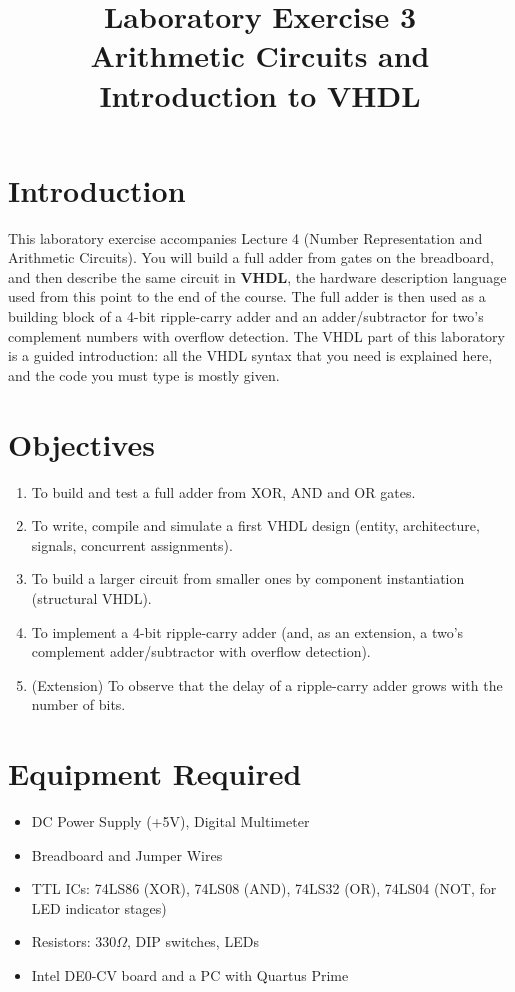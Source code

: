 \documentclass{article}
\title{Laboratory Exercise 3 \\ Arithmetic Circuits and Introduction to VHDL}
\author{}
\date{}
\begin{document}
\maketitle

\section*{Introduction}
This laboratory exercise accompanies Lecture 4 (Number Representation and Arithmetic Circuits). You will build a full adder from gates on the breadboard, and then describe the same circuit in \textbf{VHDL}, the hardware description language used from this point to the end of the course. The full adder is then used as a building block of a 4-bit ripple-carry adder and an adder/subtractor for two's complement numbers with overflow detection. The VHDL part of this laboratory is a guided introduction: all the VHDL syntax that you need is explained here, and the code you must type is mostly given.

\section*{Objectives}
\begin{enumerate}
    \item To build and test a full adder from XOR, AND and OR gates.
    \item To write, compile and simulate a first VHDL design (entity, architecture, signals, concurrent assignments).
    \item To build a larger circuit from smaller ones by component instantiation (structural VHDL).
    \item To implement a 4-bit ripple-carry adder (and, as an extension, a two's complement adder/subtractor with overflow detection).
    \item (Extension) To observe that the delay of a ripple-carry adder grows with the number of bits.
\end{enumerate}

\section*{Equipment Required}
\begin{itemize}
    \item DC Power Supply (+5V), Digital Multimeter
    \item Breadboard and Jumper Wires
    \item TTL ICs: 74LS86 (XOR), 74LS08 (AND), 74LS32 (OR), 74LS04 (NOT, for LED indicator stages)
    \item Resistors: $330\Omega$, DIP switches, LEDs
    \item Intel DE0-CV board and a PC with Quartus Prime
\end{itemize}
\end{document}
